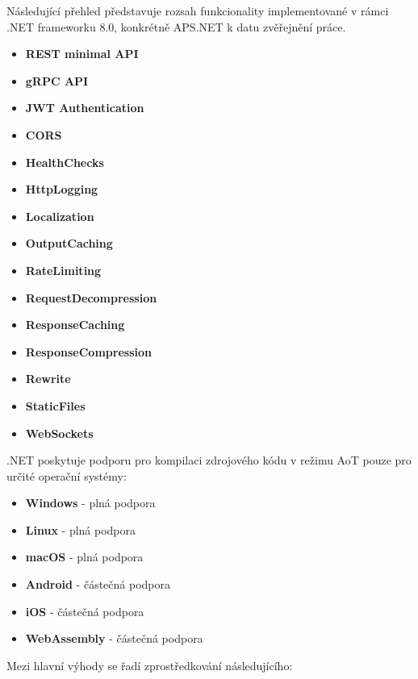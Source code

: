 
Následující přehled představuje rozsah funkcionality implementované v rámci .NET frameworku 8.0, konkrétně APS.NET k datu zvěřejnění práce.

\begin{itemize}
    \item \textbf{REST minimal API}
    \item \textbf{gRPC API}
    \item \textbf{JWT Authentication}
    \item \textbf{CORS}
    \item \textbf{HealthChecks}
    \item \textbf{HttpLogging}
    \item \textbf{Localization}
    \item \textbf{OutputCaching}
    \item \textbf{RateLimiting}
    \item \textbf{RequestDecompression}
    \item \textbf{ResponseCaching}
    \item \textbf{ResponseCompression}
    \item \textbf{Rewrite}
    \item \textbf{StaticFiles}
    \item \textbf{WebSockets}
\end{itemize}


.NET poskytuje podporu pro kompilaci zdrojového kódu v režimu AoT pouze pro určité operační systémy:

\begin{itemize}
    \item \textbf{Windows} - plná podpora
    \item \textbf{Linux} - plná podpora
    \item \textbf{macOS} - plná podpora
    \item \textbf{Android} - částečná podpora
    \item \textbf{iOS} - částečná podpora
    \item \textbf{WebAssembly} - částečná podpora
\end{itemize}




Mezi hlavní výhody se řadí zprostředkování následujícího:


